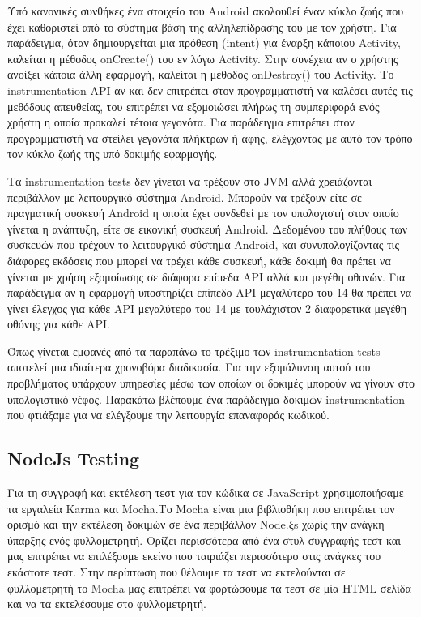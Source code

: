 		Υπό κανονικές συνθήκες ένα στοιχείο του Android ακολουθεί έναν κύκλο ζωής που έχει καθοριστεί από το σύστημα βάση της αλληλεπίδρασης του με τον χρήστη. Για παράδειγμα, όταν δημιουργείται μια πρόθεση (intent) για έναρξη κάποιου Activity, καλείται η μέθοδος onCreate() του εν λόγω Activity. Στην συνέχεια αν ο χρήστης ανοίξει κάποια άλλη εφαρμογή, καλείται η μέθοδος onDestroy() του Activity. Το instrumentation API αν και δεν επιτρέπει στον προγραμματιστή να καλέσει αυτές τις μεθόδους απευθείας, του επιτρέπει να εξομοιώσει πλήρως τη συμπεριφορά ενός χρήστη η οποία προκαλεί τέτοια γεγονότα. Για παράδειγμα επιτρέπει στον προγραμματιστή να στείλει γεγονότα πλήκτρων ή αφής, ελέγχοντας με αυτό τον τρόπο τον κύκλο ζωής της υπό δοκιμής εφαρμογής\cite{androidTestingBook}.

		Τα instrumentation tests δεν γίνεται να τρέξουν στο JVM αλλά χρειάζονται περιβάλλον με λειτουργικό σύστημα Android. Μπορούν να τρέξουν είτε σε πραγματική συσκευή Android η οποία έχει συνδεθεί με τον υπολογιστή στον οποίο γίνεται η ανάπτυξη, είτε σε εικονική συσκευή Android. Δεδομένου του πλήθους των συσκευών που τρέχουν το λειτουργικό σύστημα Android, και συνυπολογίζοντας τις διάφορες εκδόσεις που μπορεί να τρέχει κάθε συσκευή, κάθε δοκιμή θα πρέπει να γίνεται με χρήση εξομοίωσης σε διάφορα επίπεδα API αλλά και μεγέθη οθονών. Για παράδειγμα αν η εφαρμογή υποστηρίζει επίπεδο API μεγαλύτερο του 14 θα πρέπει να γίνει έλεγχος για κάθε API μεγαλύτερο του 14 με τουλάχιστον 2 διαφορετικά μεγέθη οθόνης για κάθε API. 
		
		Όπως γίνεται εμφανές από τα παραπάνω το τρέξιμο των instrumentation tests αποτελεί μια ιδιαίτερα χρονοβόρα διαδικασία. Για την εξομάλυνση αυτού του προβλήματος υπάρχουν υπηρεσίες μέσω των οποίων οι δοκιμές μπορούν να γίνουν στο υπολογιστικό νέφος. Παρακάτω βλέπουμε ένα παράδειγμα δοκιμών instrumentation που φτιάξαμε για να ελέγξουμε την λειτουργία επαναφοράς κωδικού.
		
		
		
		\subsection{NodeJs Testing}
		
		
		Για τη συγγραφή και εκτέλεση τεστ για τον κώδικα σε JavaScript χρησιμοποιήσαμε τα εργαλεία Karma και Mocha.Το Mocha είναι μια βιβλιοθήκη που επιτρέπει τον ορισμό και την εκτέλεση δοκιμών σε ένα περιβάλλον Node.ξs χωρίς την ανάγκη ύπαρξης ενός φυλλομετρητή. Ορίζει περισσότερα από ένα στυλ συγγραφής τεστ και μας επιτρέπει να επιλέξουμε εκείνο που ταιριάζει περισσότερο στις ανάγκες του εκάστοτε τεστ. Στην περίπτωση που θέλουμε τα τεστ να εκτελούνται σε φυλλομετρητή το Mocha μας επιτρέπει να φορτώσουμε τα τεστ σε μία HTML σελίδα και να τα εκτελέσουμε στο φυλλομετρητή.
		
